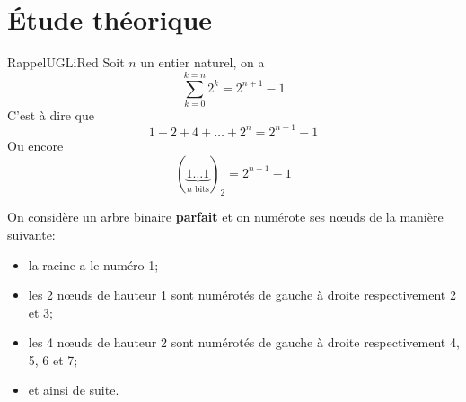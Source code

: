 \documentclass[a4paper,12pt,article,firamath]{nsi}
\begin{document}
\maketitle
\section*{\'Etude théorique}

    \begin{encadrecolore}{Rappel}{UGLiRed}
        Soit $n$ un entier naturel, on a $$\sum_{k=0}^{k=n}2^k = 2^{n+1}-1$$
        C'est à dire que
        $$1+2+4+\ldots+2^n=2^{n+1}-1$$
        Ou encore $$(\underbrace{1\ldots 1}_{n\text{ bits}})_2=2^{n+1}-1$$
    \end{encadrecolore}

    On considère un arbre binaire \textbf{parfait} et on numérote ses n\oe uds de la manière suivante:
    \begin{itemize}
        \item la racine a le numéro 1;
        \item les 2 n\oe uds de hauteur 1 sont numérotés de gauche à droite respectivement 2 et 3;
        \item les 4 n\oe uds de hauteur 2 sont numérotés de gauche à droite respectivement 4, 5, 6 et 7;
        \item et ainsi de suite.
    \end{itemize}
\end{document}

